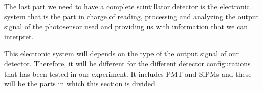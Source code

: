 The last part we need to have a complete scintillator detector is the electronic system that is the part in charge of reading, processing and analyzing the output signal of the photosensor used and providing us with information that we can interpret.

This electronic system will depends on the type of the output signal of our detector. Therefore, it will be different for the different detector configurations that has been tested in our experiment. It includes PMT and SiPMs and these will be the parts in which this section is divided.


 